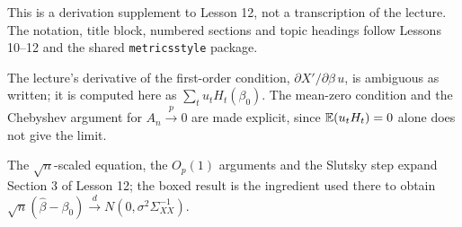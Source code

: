 \documentclass[11pt]{article}
\begin{document}
\begin{transcriptnotes}
 \item This is a derivation supplement to Lesson 12, not a transcription of the
       lecture. The notation, title block, numbered sections and topic headings
       follow Lessons 10--12 and the shared \texttt{metricsstyle} package.
 \item The lecture's derivative of the first-order condition,
       $\partial X'/\partial\beta\,u$, is ambiguous as written; it is computed
       here as $\sum_{t}u_{t}H_{t}(\beta_{0})$. The mean-zero condition and the
       Chebyshev argument for $A_{n}\xrightarrow{p}0$ are made explicit, since
       $\mathbb{E}(u_{t}H_{t})=0$ alone does not give the limit.
 \item The $\sqrt{n}$-scaled equation, the $O_{p}(1)$ arguments and the
       Slutsky step expand Section 3 of Lesson 12; the boxed result is the
       ingredient used there to obtain
       $\sqrt{n}(\hat\beta-\beta_{0})\xrightarrow{d}N(0,\sigma^{2}
       \Sigma_{XX}^{-1})$.
\end{transcriptnotes}
\end{document}
